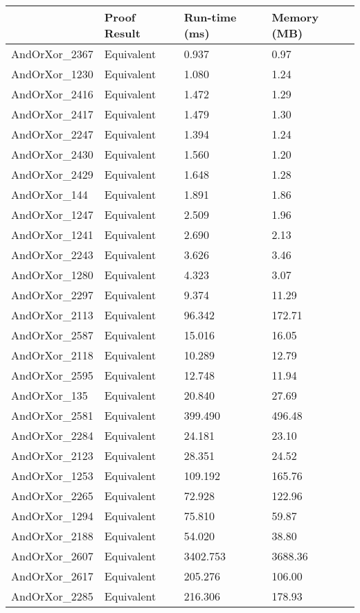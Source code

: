\begin{tabular}{llll}
\toprule
 & Proof Result & Run-time (ms) & Memory (MB) \\
\midrule
AndOrXor\_2367 & Equivalent & 0.937 & 0.97 \\
AndOrXor\_1230 & Equivalent & 1.080 & 1.24 \\
AndOrXor\_2416 & Equivalent & 1.472 & 1.29 \\
AndOrXor\_2417 & Equivalent & 1.479 & 1.30 \\
AndOrXor\_2247 & Equivalent & 1.394 & 1.24 \\
AndOrXor\_2430 & Equivalent & 1.560 & 1.20 \\
AndOrXor\_2429 & Equivalent & 1.648 & 1.28 \\
AndOrXor\_144 & Equivalent & 1.891 & 1.86 \\
AndOrXor\_1247 & Equivalent & 2.509 & 1.96 \\
AndOrXor\_1241 & Equivalent & 2.690 & 2.13 \\
AndOrXor\_2243 & Equivalent & 3.626 & 3.46 \\
AndOrXor\_1280 & Equivalent & 4.323 & 3.07 \\
AndOrXor\_2297 & Equivalent & 9.374 & 11.29 \\
AndOrXor\_2113 & Equivalent & 96.342 & 172.71 \\
AndOrXor\_2587 & Equivalent & 15.016 & 16.05 \\
AndOrXor\_2118 & Equivalent & 10.289 & 12.79 \\
AndOrXor\_2595 & Equivalent & 12.748 & 11.94 \\
AndOrXor\_135 & Equivalent & 20.840 & 27.69 \\
AndOrXor\_2581 & Equivalent & 399.490 & 496.48 \\
AndOrXor\_2284 & Equivalent & 24.181 & 23.10 \\
AndOrXor\_2123 & Equivalent & 28.351 & 24.52 \\
AndOrXor\_1253 & Equivalent & 109.192 & 165.76 \\
AndOrXor\_2265 & Equivalent & 72.928 & 122.96 \\
AndOrXor\_1294 & Equivalent & 75.810 & 59.87 \\
AndOrXor\_2188 & Equivalent & 54.020 & 38.80 \\
AndOrXor\_2607 & Equivalent & 3402.753 & 3688.36 \\
AndOrXor\_2617 & Equivalent & 205.276 & 106.00 \\
AndOrXor\_2285 & Equivalent & 216.306 & 178.93 \\

\end{tabular}
